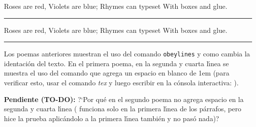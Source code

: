 {\obeylines\smallskip
Roses are red,
\quad Violets are blue;
Rhymes can typeset
\quad With boxes and glue.
\smallskip}
\medskip

\hrule

{\obeylines\smallskip
Roses are red,
\indent Violets are blue;
Rhymes can typeset
\indent With boxes and glue.
\smallskip}
\medskip

\hrule

\medskip

Los poemas anteriores muestran el uso del comando {\tt \string obeylines} y como cambia
la identaci\'on del texto. En el primera poema, en la segunda y cuarta l\'{\i}nea se 
muestra el uso del comando {\tt \string\quad} que agrega un espacio en blanco de 1em (para
verificar esto, usar el comando {\sl tex} y luego escribir en la c\'onsola interactiva:
{\tt \string\show\string\quad}).

{\bf Pendiente (TO-DO):} ?`Por qu\'e {\tt \string\indent} en el segundo poema no agrega espacio
en la segunda y cuarta l\'{\i}nea ({\tt \string\indent} funciona solo en la primera l\'{\i}nea
de los p\'arrafos, pero hice la prueba aplic\'andolo a la primera l\'{\i}nea tambi\'en y no pas\'o
nada)?
\bye